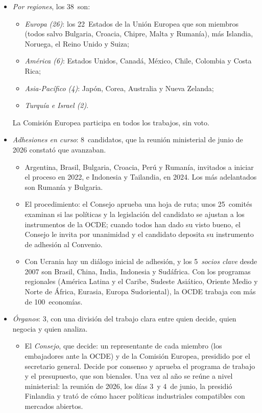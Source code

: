 \documentclass[11pt]{article}
\begin{document}
\begin{itemize}
\begin{itemize}
  \item \emph{2016-2021}: Letonia, Lituania, Colombia y Costa Rica\nocite{OCDE2026Miembros}.
  \end{itemize}
\item \emph{Por regiones}, los 38~son:
  \begin{itemize}
  \item \emph{Europa (26)}: los 22~Estados de la Unión Europea que son miembros (todos salvo Bulgaria, Croacia, Chipre, Malta y Rumanía), más Islandia, Noruega, el Reino Unido y Suiza;
  \item \emph{América (6)}: Estados Unidos, Canadá, México, Chile, Colombia y Costa Rica;
  \item \emph{Asia-Pacífico (4)}: Japón, Corea, Australia y Nueva Zelanda;
  \item \emph{Turquía e Israel (2)}.
  \end{itemize}
  La Comisión Europea participa en todos los trabajos, sin voto.
\item \emph{Adhesiones en curso}: 8~candidatos, que la reunión ministerial de junio de 2026 constató que avanzaban\nocite{OCDE2026MCM}.
  \begin{itemize}
  \item Argentina, Brasil, Bulgaria, Croacia, Perú y Rumanía, invitados a iniciar el proceso en 2022, e Indonesia y Tailandia, en 2024\nocite{OCDE2026Miembros}. Los más adelantados son Rumanía y Bulgaria.
  \item El procedimiento: el Consejo aprueba una hoja de ruta; unos 25~comités examinan si las políticas y la legislación del candidato se ajustan a los instrumentos de la OCDE; cuando todos han dado su visto bueno, el Consejo le invita por unanimidad y el candidato deposita su instrumento de adhesión al Convenio\nocite{OCDE2026Adhesion}.
  \item Con Ucrania hay un diálogo inicial de adhesión, y los 5~\emph{socios clave} desde 2007 son Brasil, China, India, Indonesia y Sudáfrica. Con los programas regionales (América Latina y el Caribe, Sudeste Asiático, Oriente Medio y Norte de África, Eurasia, Europa Sudoriental), la OCDE trabaja con más de 100~economías\nocite{OCDE2026MCM}.
  \end{itemize}
\item \emph{Órganos}: 3, con una división del trabajo clara entre quien decide, quien negocia y quien analiza\nocite{OCDE2026Estructura}.
  \begin{itemize}
  \item El \emph{Consejo}, que decide: un representante de cada miembro (los embajadores ante la OCDE) y de la Comisión Europea, presidido por el secretario general. Decide por consenso y aprueba el programa de trabajo y el presupuesto, que son bienales. Una vez al año se reúne a nivel ministerial: la reunión de 2026, los días 3~y 4~de junio, la presidió Finlandia y trató de cómo hacer políticas industriales compatibles con mercados abiertos\nocite{OCDE2026MCM}.

\end{itemize}
\end{itemize}
\end{document}
